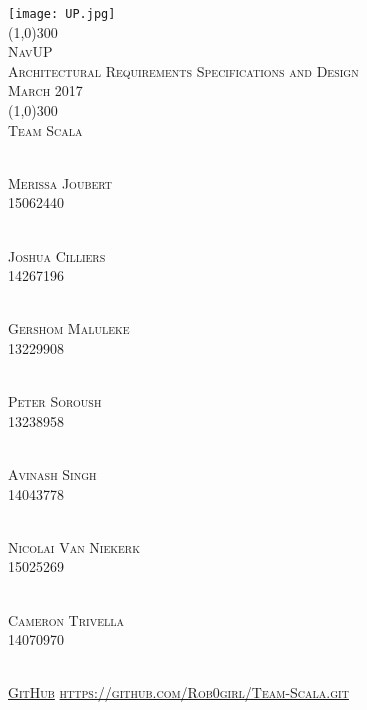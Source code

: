 \documentclass[runningheads,a4paper]{article}
\begin{document}
	\begin{titlepage}
		\begin{center}
			\texttt{[image: UP.jpg]}  \\
			[1cm]
			\line(1,0){300} \\
			[0.3cm]
			\textsc{\Large
				NavUP\\
				Architectural Requirements Specifications and Design \\
			\hfill {} March 2017
			}\\
			[0.1cm]
			\line(1,0){300} \\
			[0.7cm]
			\textsc{\Large
				Team Scala
			} \\
			
			
			
		\end{center}
		
		\begin{center}
			\begin{multicols}{2}
				\textsc{\large\\
					Merissa Joubert \\ 
					15062440\\ 
				}
				
				\textsc{\large\\
					Joshua Cilliers \\
					14267196\\ 
				}
				
				\textsc{\large\\
			        Gershom Maluleke \\
				 	13229908\\ 
				}
				
				\textsc{\large\\
					Peter Soroush\\
					13238958\\ 
				}
				
				\columnbreak
				
				\textsc{\large\\
					 Avinash Singh\\
					14043778\\
				}
				
				\textsc{\large\\
					Nicolai Van Niekerk\\
					15025269\\
				}
				
				\textsc{\large\\
					Cameron Trivella\\
					14070970\\ 
				}
				
			\end{multicols}
			
			
			\textsc{	\\ \href{https://github.com/Rob0girl/Team-Scala.git}{GitHub}
				\url{https://github.com/Rob0girl/Team-Scala.git}}
			
		\end{center}
	\end{titlepage}

\begingroup

\tableofcontents
{}
\endgroup
\newpage


\end{document}
